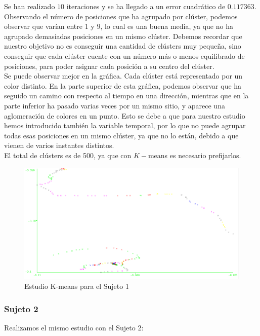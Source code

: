 \documentclass[a4paper, 12pt]{article}
\begin{document}
Se han realizado $10$ iteraciones y se ha llegado a un error cuadr\'atico de $0.117363$. Observando el n\'umero de posiciones que ha agrupado por cl\'uster, podemos observar que var\'ian entre $1$ y $9$, lo cual es una buena media, ya que no ha agrupado demasiadas posiciones en un mismo cl\'uster. Debemos recordar que nuestro objetivo no es conseguir una cantidad de cl\'usters muy peque\~na, sino conseguir que cada cl\'uster cuente con un n\'umero m\'as o menos equilibrado de posiciones, para poder asignar cada posici\'on a su centro del cl\'uster.\\ 

Se puede observar mejor en la gr\'afica. Cada cl\'uster est\'a representado por un color distinto. En la parte superior de esta gr\'afica, podemos observar que ha seguido un camino con respecto al tiempo en una direcci\'on, mientras que en la parte inferior ha pasado varias veces por un mismo sitio, y aparece una aglomeraci\'on de colores en un punto. Esto se debe a que para nuestro estudio hemos introducido tambi\'en la variable temporal, por lo que no puede agrupar todas esas posiciones en un mismo cl\'uster, ya que no lo est\'an, debido a que vienen de varios instantes distintos. \\

El total de cl\'usters es de 500, ya que con $K-$means es necesario prefijarlos.

\begin{figure}[H]
	\includegraphics[scale=.5]{../comparativa/kMeansSujeto1.png}
	\caption{Estudio K-means para el Sujeto 1}
\end{figure}


\subsubsection{Sujeto 2}

Realizamos el mismo estudio con el Sujeto 2:\\
\end{document}
